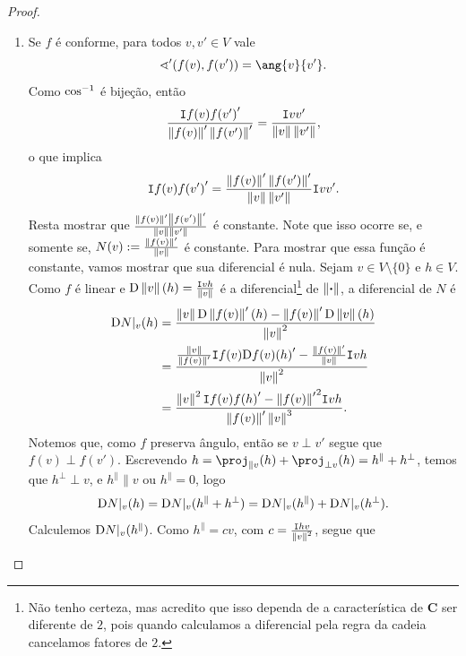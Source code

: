 \begin{proof}
\begin{enumerate}
	\item Se $f$ é conforme, para todos $v,v' \in V$ vale
		\begin{equation*}
		\sphericalangle'(f(v),f(v')) = \ang{v}{v'}.
		\end{equation*}
Como $\cos^{-1}$ é bijeção, então
	\begin{equation*}
	\frac{\mathtt I{f(v)}{f(v')}'}{\left\Vert{f(v)}\right\Vert'\left\Vert{f(v')}\right\Vert'} = \frac{\mathtt I{v}{v'}}{\left\Vert{v}\right\Vert\left\Vert{v'}\right\Vert},
	\end{equation*}
o que implica
	\begin{equation*}
	\mathtt I{f(v)}{f(v')}' = \frac{\left\Vert{f(v)}\right\Vert'\left\Vert{f(v')}\right\Vert'}{\left\Vert{v}\right\Vert\left\Vert{v'}\right\Vert}\mathtt I{v}{v'}.
	\end{equation*}
Resta mostrar que $\frac{\left\Vert{f(v)}\right\Vert'\left\Vert{f(v')}\right\Vert'}{\left\Vert{v}\right\Vert\left\Vert{v'}\right\Vert}$ é constante. Note que isso ocorre se, e somente se, $N(v) := \frac{\left\Vert{f(v)}\right\Vert'}{\left\Vert{v}\right\Vert}$ é constante. Para mostrar que essa função é constante, vamos mostrar que sua diferencial é nula. Sejam $v \in V \setminus \{0\}$ e $h \in V$. Como $f$ é linear e $\mathrm{D} \left\Vert{v}\right\Vert(h) = \frac{\mathtt I{v}{h}}{\left\Vert{v}\right\Vert}$ é a diferencial\footnote{Não tenho certeza, mas acredito que isso dependa de a característica de $\bm C$ ser diferente de $2$, pois quando calculamos a diferencial pela regra da cadeia cancelamos fatores de $2$.} de $\left\Vert{\bm{\cdot}}\right\Vert$, a diferencial de $N$ é
	\begin{align*}
	\mathrm{D} N|_v (h) &= \frac{\left\Vert{v}\right\Vert \mathrm{D} \left\Vert{f(v)}\right\Vert'(h) - \left\Vert{f(v)}\right\Vert'\mathrm{D} \left\Vert{v}\right\Vert(h)}{\left\Vert{v}\right\Vert^2} \\
		&= \frac{\frac{\left\Vert{v}\right\Vert}{\left\Vert{f(v)}\right\Vert'} \mathtt I{f(v)}{\mathrm{D} f(v)(h)}' - \frac{\left\Vert{f(v)}\right\Vert'}{\left\Vert{v}\right\Vert}\mathtt I{v}{h}}{\left\Vert{v}\right\Vert^2} \\
		&= \frac{\left\Vert{v}\right\Vert^2\mathtt I{f(v)}{f(h)}' - {\left\Vert{f(v)}\right\Vert'}^2\mathtt I{v}{h}}{\left\Vert{f(v)}\right\Vert'\left\Vert{v}\right\Vert^3}.
	\end{align*}
Notemos que, como $f$ preserva ângulo, então se $v \perp v'$ segue que $f(v) \perp f(v')$. Escrevendo $h = \proj_{\parallel v}(h) + \proj_{\perp v}(h) = h^\parallel + h^\perp$, temos que $h^\perp \perp v$, e $h^\parallel \parallel v$ ou $h^\parallel = 0$, logo
	\begin{equation*}
	\mathrm{D} N|_v (h) = \mathrm{D} N|_v (h^\parallel + h^\perp) =  \mathrm{D} N|_v (h^\parallel) + \mathrm{D} N|_v (h^\perp).
	\end{equation*}
Calculemos $\mathrm{D} N|_v (h^\parallel)$.
Como $h^\parallel = cv$, com $c=\frac{\mathtt I{h}{v}}{\left\Vert{v}\right\Vert^2}$, segue que

\end{enumerate}
\end{proof}
